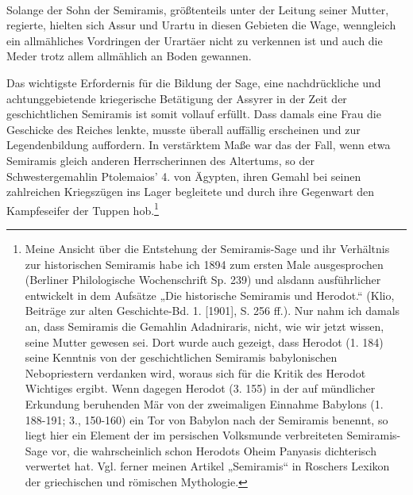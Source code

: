 \documentclass[a4paper, 11pt, oneside, polutonikogreek, german]{article}
\begin{document}
\paragraph{}
Solange der Sohn der Semiramis, größtenteils unter der Leitung seiner Mutter, regierte, hielten sich Assur und Urartu in diesen Gebieten die Wage, wenngleich ein allmähliches Vordringen der Urartäer nicht zu verkennen ist und auch die Meder trotz allem allmählich an Boden gewannen.

Das wichtigste Erfordernis für die Bildung der Sage, eine nachdrückliche und achtunggebietende kriegerische Betätigung der Assyrer in der Zeit der geschichtlichen Semiramis ist somit vollauf erfüllt. Dass damals eine Frau die Geschicke des Reiches lenkte, musste überall auffällig erscheinen und zur Legendenbildung auffordern. In verstärktem Maße war das der Fall, wenn etwa Semiramis gleich anderen Herrscherinnen des Altertums, so der Schwestergemahlin Ptolemaios' 4. von Ägypten, ihren Gemahl bei seinen zahlreichen Kriegszügen ins Lager begleitete und durch ihre Gegenwart den Kampfeseifer der Tuppen hob.\footnote{Meine Ansicht über die Entstehung der Semiramis-Sage und ihr Verhältnis zur historischen Semiramis habe ich 1894 zum ersten Male ausgesprochen (Berliner Philologische Wochenschrift Sp. 239) und alsdann ausführlicher entwickelt in dem Aufsätze „Die historische Semiramis und Herodot.“ (Klio, Beiträge zur alten Geschichte-Bd. 1. [1901], S. 256 ff.). Nur nahm ich damals an, dass Semiramis die Gemahlin Adadniraris, nicht, wie wir jetzt wissen, seine Mutter gewesen sei. Dort wurde auch gezeigt, dass Herodot (1. 184) seine Kenntnis von der geschichtlichen Semiramis babylonischen Nebopriestern verdanken wird, woraus sich für die Kritik des Herodot Wichtiges ergibt. Wenn dagegen Herodot (3. 155) in der auf mündlicher Erkundung beruhenden Mär von der zweimaligen Einnahme Babylons (1. 188-191; 3., 150-160) ein Tor von Babylon nach der Semiramis benennt, so liegt hier ein Element der im persischen Volksmunde verbreiteten Semiramis-Sage vor, die wahrscheinlich schon Herodots Oheim Panyasis dichterisch verwertet hat. Vgl. ferner meinen Artikel „Semiramis“ in Roschers Lexikon der griechischen und römischen Mythologie.}
\end{document}
